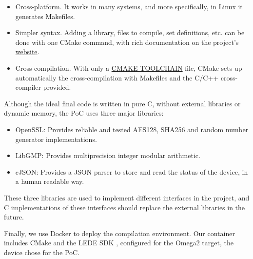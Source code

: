 \begin{itemize}
	\item Cross-platform. It works in many systems, and more specifically, in Linux it generates Makefiles.
	\item Simpler syntax. Adding a library, files to compile, set definitions, etc. can be done with one CMake command, with rich documentation on the project's \href{https://cmake.org/cmake/help/latest/}{website}.
	\item Cross-compilation. With only a \href{http://www.vtk.org/Wiki/CMake_Cross_Compiling#The_toolchain_file}{\small{CMAKE TOOLCHAIN}} file, CMake sets up automatically the cross-compilation with Makefiles and the C/C++ cross-compiler provided.
\end{itemize}


\hfil

Although the ideal final code is written in pure C, without external libraries or dynamic memory, the PoC uses three major libraries:

\begin{itemize}
	\item OpenSSL: Provides reliable and tested AES128, SHA256 and random number generator implementations.
	\item LibGMP: Provides multiprecision integer modular arithmetic.
	\item cJSON: Provides a JSON parser to store and read the status of the device, in a human readable way.
\end{itemize}

These three libraries are used to implement different interfaces in the project, and C implementations of these interfaces should replace the external libraries in the future.

\hfil

Finally, we use Docker to deploy the compilation environment. Our container includes CMake and the LEDE SDK \citep{ledeproject}, configured for the Omega2 target, the device chose for the PoC.


